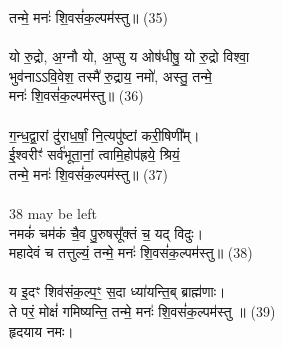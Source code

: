 तन्मे॒ मनः॑ शि॒वसं॑क॒ल्पम॑स्तु॥ (35)\\
\\
यो रु॒द्रो, अ॒ग्नौ यो, अ॒प्सु य ओष॑धीषु॒ यो रु॒द्रो विश्वा॒ \\
भुव॑नाऽऽवि॒वेश॒ तस्मै॑ रु॒द्राय॒ नमो॑, अस्तु॒ तन्मे॒ \\
मनः॑ शि॒वसं॑क॒ल्पम॑स्तु॥ (36)\\
\\
ग॒न्ध॒द्वा॒रां दु॑राध॒र्षां॒ नि॒त्यपु॑ष्टां करी॒षिणी᳚म्। \\
ई॒श्वरीꣳ॑ सर्व॑भूता॒नां॒ त्वामि॒होप॑ह्रये॒ श्रियं॒  \\
तन्मे॒ मनः॑ शि॒वसं॑क॒ल्पम॑स्तु॥ (37)\\
\\
{\small 38 may be left}\\
नमकं॑ चम॑कं चै॒व पु॒रुषसू᳚क्तं च॒ यद् विदुः। \\
महादेवं च तत्तुल्यं॒ तन्मे॒ मनः॑ शि॒वसं॑क॒ल्पम॑स्तु॥ (38)\\
\\
य इ॒दꣳ शिव॑संक॒ल्प॒ꣳ॒ स॒दा ध्या॑यन्ति॒ब् ब्राह्म॑णाः। \\
ते परं॒ मोक्षं॑ गमिष्यन्ति॒ तन्मे॒ मनः॑ शि॒वसं॑क॒ल्पम॑स्तु ॥ (39)\\
हृदयाय नमः।\\
